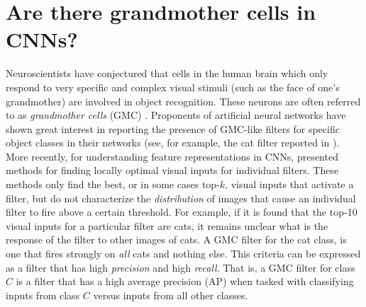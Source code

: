 \section{Are there grandmother cells in CNNs?}
\label{sec:grand-mother}
Neuroscientists have conjectured that cells in the human brain which only respond to very specific and complex visual stimuli (such as the face of one's grandmother) are involved in object recognition.
These neurons are often referred to as \emph{grandmother cells} (GMC) \cite{Barlow,Grandmother}. Proponents of artificial neural networks have shown great interest in reporting the presence of GMC-like filters for specific object classes in their networks (see, for example, the cat filter reported in \cite{GoogleCat}). More recently, for understanding feature representations in CNNs, \cite{Simonyan,DeConv} presented methods for finding locally optimal visual inputs for individual filters.
These methods only find the best, or in some cases top-$k$, visual inputs that activate a filter, but do not characterize the \emph{distribution} of images that cause an individual filter to fire above a certain threshold. For example, if it is found that the top-10 visual inputs for a particular filter are cats, it remains unclear what is the response of the filter to other images of cats.
A GMC filter for the cat class, is one that fires strongly on \emph{all} cats and nothing else.
This criteria can be expressed as a filter that has high \emph{precision} and high \emph{recall}.
That is, a GMC filter for class $C$ is a filter that has a high average precision (AP) when tasked with classifying inputs from class $C$ versus inputs from all other classes.

 
